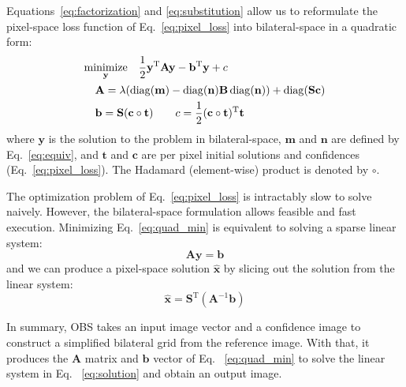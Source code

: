 Equations~\ref{eq:factorization} and \ref{eq:substitution} allow us to reformulate the pixel-space loss function of Eq.~\ref{eq:pixel_loss} into bilateral-space in a quadratic form:
\begin{align}
& \underset{\mathbf{y}}{\mathrm{minimize}} \quad  {1 \over 2} \mathbf{y}^\mathrm{T} \mathbf{A} \mathbf{y} - \mathbf{b}^\mathrm{T} \mathbf{y} + c \label{eq:quad_min} \\
&\quad \mathbf{A} = \lambda ( \operatorname{diag}(\mathbf{m}) - \operatorname{diag}(\mathbf{n}) \mathbf{B} \operatorname{diag}(\mathbf{n})) + \mathrm{diag}(\mathbf{S} \mathbf{c}) \nonumber \\
&\quad \mathbf{b} = \mathbf{S} ( \mathbf{c} \circ \mathbf{t} ) \quad\quad c = {1 \over 2} (\mathbf{c} \circ \mathbf{t})^\mathrm{T} \mathbf{t} \nonumber
\end{align}
where $\mathbf{y}$ is the solution to the problem in bilateral-space, $\mathbf{m}$ and $\mathbf{n}$ are defined by Eq.~\ref{eq:equiv}, and $\mathbf{t}$ and $\mathbf{c}$ are per pixel initial solutions and confidences (Eq.~\ref{eq:pixel_loss}).
The Hadamard (element-wise) product is denoted by $\circ$.



The optimization problem of Eq.~\ref{eq:pixel_loss} is intractably slow to solve naively. However, the bilateral-space formulation allows feasible and fast execution.
Minimizing Eq.~\ref{eq:quad_min} is equivalent to solving a sparse linear system:
\begin{equation*}
\mathbf{A}\mathbf{y} = \mathbf{b}
\end{equation*}
and we can produce a pixel-space solution $\mathbf{\hat x}$ by slicing out the solution from the linear system:
\begin{equation}
\mathbf{\hat x} = \mathbf{S}^\mathrm{T}(\mathbf{A}^{-1} \mathbf{b})
\label{eq:solution}
\end{equation}

In summary, OBS takes an input image vector and a confidence image to construct a simplified bilateral grid from the reference image. With that, it produces the $\mathbf{A}$ matrix and $\mathbf{b}$ vector of Eq. ~\ref{eq:quad_min} to solve the linear system in Eq. ~\ref{eq:solution} and obtain an output image.

